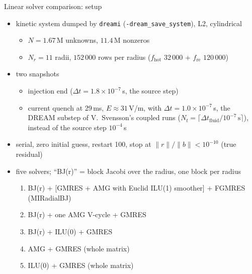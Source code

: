 
\begin{frame}{Linear solver comparison: setup}
    \small
    \begin{itemize}
        \item kinetic system dumped by \texttt{dreami} (\texttt{-dream\_save\_system}), L2, cylindrical
        \begin{itemize}
            \item $N = 1.67$\,M unknowns, $11.4$\,M nonzeros
            \item $N_r = 11$ radii, $152\,000$ rows per radius ($f_\mathrm{hot}$ $32\,000$ + $f_\mathrm{re}$ $120\,000$)
        \end{itemize}
        \item two snapshots
        \begin{itemize}
            \item injection end ($\Delta t = 1.8\times10^{-7}$\,s, the source step)
            \item current quench at 29\,ms, $E \approx 31$\,V/m, with
                  $\Delta t = 1.0\times10^{-7}$\,s, the DREAM substep of V.~Svensson's coupled runs
                  ($N_t = \lceil \Delta t_\mathrm{fluid} / 10^{-7}\,\mathrm{s} \rceil$),
                  instead of the source step $10^{-4}$\,s
        \end{itemize}
        \item serial, zero initial guess, restart 100, stop at $\|r\|/\|b\| < 10^{-10}$ (true residual)
        \item five solvers; ``BJ(r)'' = block Jacobi over the radius, one block per radius
        \begin{enumerate}
            \item BJ(r) + [GMRES + AMG with Euclid ILU(1) smoother] + FGMRES \quad (MIRadialBJ)
            \item BJ(r) + one AMG V-cycle + GMRES
            \item BJ(r) + ILU(0) + GMRES
            \item AMG + GMRES \quad (whole matrix)
            \item ILU(0) + GMRES \quad (whole matrix)
        \end{enumerate}
    \end{itemize}
\end{frame}

